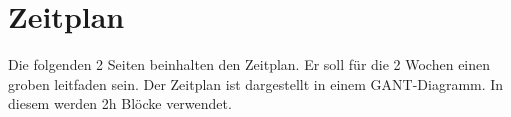 \chapter{Zeitplan}\label{ch:zeitplan}
Die folgenden 2 Seiten beinhalten den Zeitplan. Er soll für die 2 Wochen einen groben leitfaden sein. Der Zeitplan ist dargestellt in einem GANT-Diagramm. In diesem werden 2h Blöcke verwendet.
\begin{landscape}
	
\end{landscape}